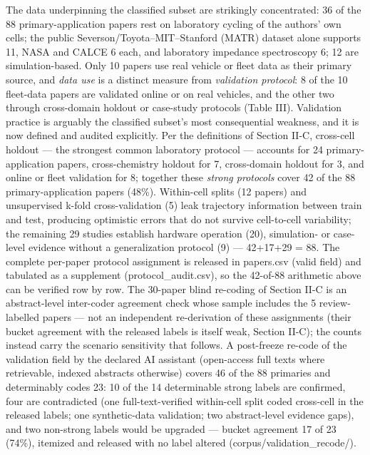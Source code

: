 \documentclass[journal]{IEEEtran}
\begin{document}
The data underpinning the classified subset are strikingly concentrated: 36 of the 88 primary-application papers rest on laboratory cycling of the authors' own cells; the public Severson/Toyota--MIT--Stanford (MATR) dataset alone supports 11, NASA and CALCE 6 each, and laboratory impedance spectroscopy 6; 12 are simulation-based. Only 10 papers use real vehicle or fleet data as their primary source, and \textit{data use} is a distinct measure from \textit{validation protocol}: 8 of the 10 fleet-data papers are validated online or on real vehicles, and the other two through cross-domain holdout or case-study protocols (Table III). Validation practice is arguably the classified subset's most consequential weakness, and it is now defined and audited explicitly. Per the definitions of Section II-C, cross-cell holdout --- the strongest common laboratory protocol --- accounts for 24 primary-application papers, cross-chemistry holdout for 7, cross-domain holdout for 3, and online or fleet validation for 8; together these \textit{strong protocols} cover 42 of the 88 primary-application papers (48\%). Within-cell splits (12 papers) and unsupervised k-fold cross-validation (5) leak trajectory information between train and test, producing optimistic errors that do not survive cell-to-cell variability; the remaining 29 studies establish hardware operation (20), simulation- or case-level evidence without a generalization protocol (9) --- 42+17+29 = 88. The complete per-paper protocol assignment is released in papers.csv (valid field) and tabulated as a supplement (protocol\_audit.csv), so the 42-of-88 arithmetic above can be verified row by row. The 30-paper blind re-coding of Section II-C is an abstract-level inter-coder agreement check whose sample includes the 5 review-labelled papers --- not an independent re-derivation of these assignments (their bucket agreement with the released labels is itself weak, Section II-C); the counts instead carry the scenario sensitivity that follows. A post-freeze re-code of the validation field by the declared AI assistant (open-access full texts where retrievable, indexed abstracts otherwise) covers 46 of the 88 primaries and determinably codes 23: 10 of the 14 determinable strong labels are confirmed, four are contradicted (one full-text-verified within-cell split coded cross-cell in the released labels; one synthetic-data validation; two abstract-level evidence gaps), and two non-strong labels would be upgraded --- bucket agreement 17 of 23 (74\%), itemized and released with no label altered (corpus/validation\_recode/).
\end{document}
